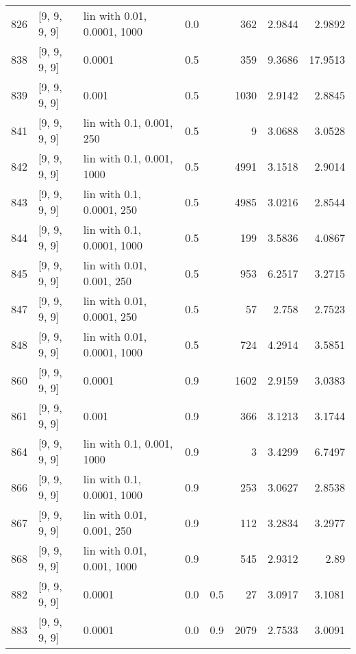 \begin{longtable}{lllrrrrr}
  826 &       [9, 9, 9, 9] & lin with 0.01, 0.0001, 1000 &      0.0 &     &  362 &   2.9844 &   2.9892 \\
  838 &       [9, 9, 9, 9] &                      0.0001 &      0.5 &     &  359 &   9.3686 &  17.9513 \\
  839 &       [9, 9, 9, 9] &                       0.001 &      0.5 &     & 1030 &   2.9142 &   2.8845 \\
  841 &       [9, 9, 9, 9] &    lin with 0.1, 0.001, 250 &      0.5 &     &    9 &   3.0688 &   3.0528 \\
  842 &       [9, 9, 9, 9] &   lin with 0.1, 0.001, 1000 &      0.5 &     & 4991 &   3.1518 &   2.9014 \\
  843 &       [9, 9, 9, 9] &   lin with 0.1, 0.0001, 250 &      0.5 &     & 4985 &   3.0216 &   2.8544 \\
  844 &       [9, 9, 9, 9] &  lin with 0.1, 0.0001, 1000 &      0.5 &     &  199 &   3.5836 &   4.0867 \\
  845 &       [9, 9, 9, 9] &   lin with 0.01, 0.001, 250 &      0.5 &     &  953 &   6.2517 &   3.2715 \\
  847 &       [9, 9, 9, 9] &  lin with 0.01, 0.0001, 250 &      0.5 &     &   57 &    2.758 &   2.7523 \\
  848 &       [9, 9, 9, 9] & lin with 0.01, 0.0001, 1000 &      0.5 &     &  724 &   4.2914 &   3.5851 \\
  860 &       [9, 9, 9, 9] &                      0.0001 &      0.9 &     & 1602 &   2.9159 &   3.0383 \\
  861 &       [9, 9, 9, 9] &                       0.001 &      0.9 &     &  366 &   3.1213 &   3.1744 \\
  864 &       [9, 9, 9, 9] &   lin with 0.1, 0.001, 1000 &      0.9 &     &    3 &   3.4299 &   6.7497 \\
  866 &       [9, 9, 9, 9] &  lin with 0.1, 0.0001, 1000 &      0.9 &     &  253 &   3.0627 &   2.8538 \\
  867 &       [9, 9, 9, 9] &   lin with 0.01, 0.001, 250 &      0.9 &     &  112 &   3.2834 &   3.2977 \\
  868 &       [9, 9, 9, 9] &  lin with 0.01, 0.001, 1000 &      0.9 &     &  545 &   2.9312 &     2.89 \\
  882 &       [9, 9, 9, 9] &                      0.0001 &      0.0 & 0.5 &   27 &   3.0917 &   3.1081 \\
  883 &       [9, 9, 9, 9] &                      0.0001 &      0.0 & 0.9 & 2079 &   2.7533 &   3.0091 \\

\end{longtable}
